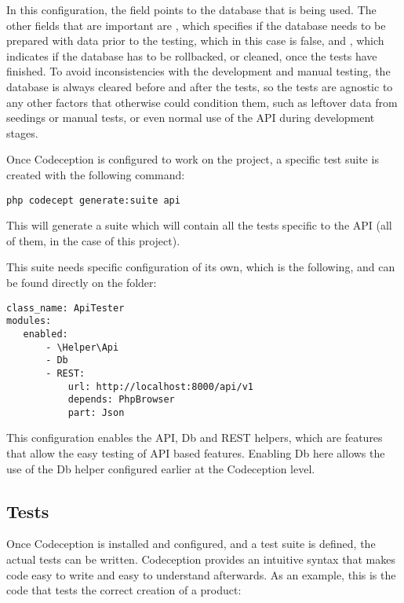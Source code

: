 In this configuration, the  field points to the database that is being used. The other fields that are important are , which specifies if the database needs to be prepared with data prior to the testing, which in this case is false, and , which indicates if the database has to be rollbacked, or cleaned, once the tests have finished. To avoid inconsistencies with the development and manual testing, the database is always cleared before and after the tests, so the tests are agnostic to any other factors that otherwise could condition them, such as leftover data from seedings or manual tests, or even normal use of the API during development stages.

Once Codeception is configured to work on the project, a specific test suite is created with the following command:

\begin{verbatim}
php codecept generate:suite api
\end{verbatim}

This will generate a suite which will contain all the tests specific to the API (all of them, in the case of this project).

This suite needs specific configuration of its own, which is the following, and can be found directly on the  folder:

\begin{verbatim}
class_name: ApiTester
modules:
   enabled:
       - \Helper\Api
       - Db
       - REST:
           url: http://localhost:8000/api/v1
           depends: PhpBrowser
           part: Json
\end{verbatim}

This configuration enables the API, Db and REST helpers, which are features that allow the easy testing of API based features. Enabling Db here allows the use of the Db helper configured earlier at the Codeception level.

\subsection{Tests}
Once Codeception is installed and configured, and a test suite is defined, the actual tests can be written. Codeception provides an intuitive syntax that makes code easy to write and easy to understand afterwards. As an example, this is the code that tests the correct creation of a product:

